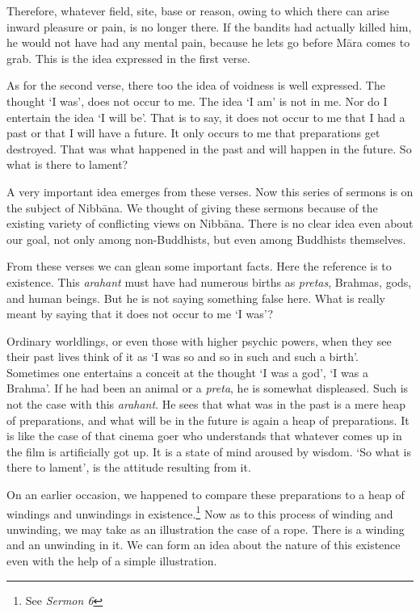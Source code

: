 Therefore, whatever field, site, base or reason, owing to which there can arise inward pleasure or pain, is no longer there. If the bandits had actually killed him, he would not have had any mental pain, because he lets go before Māra comes to grab. This is the idea expressed in the first verse.

As for the second verse, there too the idea of voidness is well expressed. The thought `I was', does not occur to me. The idea `I am' is not in me. Nor do I entertain the idea `I will be'. That is to say, it does not occur to me that I had a past or that I will have a future. It only occurs to me that preparations get destroyed. That was what happened in the past and will happen in the future. So what is there to lament?

A very important idea emerges from these verses. Now this series of sermons is on the subject of Nibbāna. We thought of giving these sermons because of the existing variety of conflicting views on Nibbāna. There is no clear idea even about our goal, not only among non-Buddhists, but even among Buddhists themselves.

From these verses we can glean some important facts. Here the reference is to existence. This \emph{arahant} must have had numerous births as \emph{pretas}, Brahmas, gods, and human beings. But he is not saying something false here. What is really meant by saying that it does not occur to me `I was'?

Ordinary worldlings, or even those with higher psychic powers, when they see their past lives think of it as `I was so and so in such and such a birth'. Sometimes one entertains a conceit at the thought `I was a god', `I was a Brahma'. If he had been an animal or a \emph{preta}, he is somewhat displeased. Such is not the case with this \emph{arahant}. He sees that what was in the past is a mere heap of preparations, and what will be in the future is again a heap of preparations. It is like the case of that cinema goer who understands that whatever comes up in the film is artificially got up. It is a state of mind aroused by wisdom. `So what is there to lament', is the attitude resulting from it.

On an earlier occasion, we happened to compare these preparations to a heap of windings and unwindings in existence.\footnote{See \emph{Sermon 6}} Now as to this process of winding and unwinding, we may take as an illustration the case of a rope. There is a winding and an unwinding in it. We can form an idea about the nature of this existence even with the help of a simple illustration.

